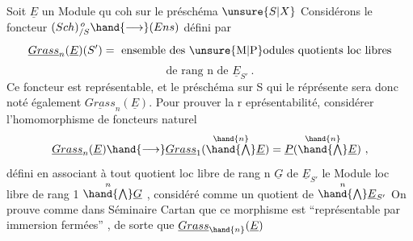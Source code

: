 Soit  $\underline{E}$  un Module qu coh  sur le préschéma $\unsure{S|X}$ Considérons le
foncteur \qquad $(Sch)_{/S}^{\,o} \hand{\longrightarrow} (Ens)$  défini par
\[ \underline{Grass}_n(\underline{E})(S') = \text{ ensemble des \unsure{M|P}odules quotients loc libres} \]
\[ \text{de rang  n  de } \underline{E}_{S'} \ . \]
Ce foncteur est représentable, et le préschéma sur S qui le réprésente
sera donc noté également $\underline{Grass}_n(\underline{E})$.  Pour prouver la r eprésentabilité,
considérer l'homomorphisme de foncteurs naturel
\[ \underline{Grass}_n(\underline{E}) \hand{\longrightarrow} \underline{Grass}_1( \overset{\hand{n}}{\textstyle\hand{\bigwedge}} \underline{E} ) = \underline{P} ( \overset{\hand{n}}{\textstyle\hand{\bigwedge}} \underline{E}) \ , \]
défini en associant à  tout  quotient loc libre  de rang n  $\underline{G}$  de $\underline{E}_{S'}$
le Module  loc libre de rang 1 \quad $\overset{n}{\textstyle\hand{\bigwedge}} \underline{G}$ , considéré comme un quotient
de  $\overset{n}{\textstyle\hand{\bigwedge}} \underline{E}_{S'}$   On prouve comme dans  Séminaire Cartan que  ce morphisme
est  ``représentable par  immersion fermées'' , de sorte que $\underline{Grass}_{\hand{n}}(\underline{E})$

